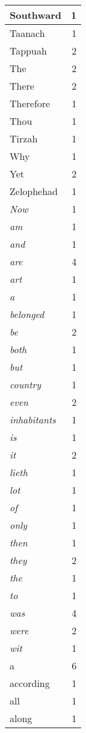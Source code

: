 \begin{center}
\begin{longtable}{l|r}
Southward & 1 \\ \hline
Taanach & 1 \\ \hline
Tappuah & 2 \\ \hline
The & 2 \\ \hline
There & 2 \\ \hline
Therefore & 1 \\ \hline
Thou & 1 \\ \hline
Tirzah & 1 \\ \hline
Why & 1 \\ \hline
Yet & 2 \\ \hline
Zelophehad & 1 \\ \hline
\emph{Now} & 1 \\ \hline
\emph{am} & 1 \\ \hline
\emph{and} & 1 \\ \hline
\emph{are} & 4 \\ \hline
\emph{art} & 1 \\ \hline
\emph{a} & 1 \\ \hline
\emph{belonged} & 1 \\ \hline
\emph{be} & 2 \\ \hline
\emph{both} & 1 \\ \hline
\emph{but} & 1 \\ \hline
\emph{country} & 1 \\ \hline
\emph{even} & 2 \\ \hline
\emph{inhabitants} & 1 \\ \hline
\emph{is} & 1 \\ \hline
\emph{it} & 2 \\ \hline
\emph{lieth} & 1 \\ \hline
\emph{lot} & 1 \\ \hline
\emph{of} & 1 \\ \hline
\emph{only} & 1 \\ \hline
\emph{then} & 1 \\ \hline
\emph{they} & 2 \\ \hline
\emph{the} & 1 \\ \hline
\emph{to} & 1 \\ \hline
\emph{was} & 4 \\ \hline
\emph{were} & 2 \\ \hline
\emph{wit} & 1 \\ \hline
a & 6 \\ \hline
according & 1 \\ \hline
all & 1 \\ \hline
along & 1 \\ \hline

\end{longtable}
\end{center}
